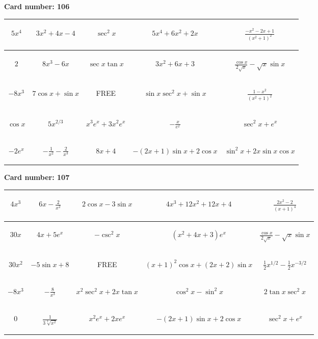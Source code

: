 \documentclass{article}
\newcommand{\entry}[1]{\begin{minipage}[t][2.75cm][t]{4cm} \vspace{1cm} \begin{center}#1\end{center} \end{minipage}}
\newcommand{\freespace}{\entry{FREE}}
\newcommand{\cardnumber}[1]{\noindent \textbf{Card number: #1} \bigskip}
\begin{document}
\pagebreak

\cardnumber{106}
\begin{center}
\begin{tabular}{|*{5}{c|}}
    \hline
    \entry{$5x^4$} & \entry{$3x^2 + 4x - 4$} & \entry{$\sec^2 x$} & \entry{$5x^4 + 6x^2 + 2x$} & \entry{$\frac{-x^2 - 2x + 1}{(x^2 + 1)^2}$} \\ \hline
    \entry{$2$} & \entry{$8x^3 - 6x$} & \entry{$\sec x \tan x$} & \entry{$3x^2 + 6x + 3$} & \entry{$\frac{\cos x}{2 \sqrt{x}} - \sqrt{x} \sin x$} \\ \hline
    \entry{$-8x^3$} & \entry{$7 \cos x + \sin x$} & \freespace & \entry{$\sin x \sec^2 x + \sin x$} & \entry{$\frac{1 - x^2}{(x^2 + 1)^2}$} \\ \hline
    \entry{$\cos x$} & \entry{$5x^{2/3}$} & \entry{$x^3 e^x + 3x^2 e^x$} & \entry{$-\frac{x}{e^x}$} & \entry{$\sec^2 x + e^x$} \\ \hline
    \entry{$-2e^x$} & \entry{$-\frac{1}{x^2} - \frac{2}{x^3}$} & \entry{$8x + 4$} & \entry{$-(2x + 1) \sin x + 2 \cos x$} & \entry{$\sin^2 x + 2x \sin x \cos x$} \\ \hline
\end{tabular}
\end{center}

\pagebreak

\cardnumber{107}
\begin{center}
\begin{tabular}{|*{5}{c|}}
    \hline
    \entry{$4x^3$} & \entry{$6x - \frac{2}{x^2}$} & \entry{$2 \cos x - 3 \sin x$} & \entry{$4x^3 + 12x^2 + 12x + 4$} & \entry{$\frac{2x^2 - 2}{(x + 1)^4}$} \\ \hline
    \entry{$30x$} & \entry{$4x + 5e^x$} & \entry{$-\csc^2 x$} & \entry{$(x^2 + 4x + 3) e^x$} & \entry{$\frac{\cos x}{2 \sqrt{x}} - \sqrt{x} \sin x$} \\ \hline
    \entry{$30x^2$} & \entry{$-5 \sin x + 8$} & \freespace & \entry{$(x + 1)^2 \cos x + (2x + 2) \sin x$} & \entry{$\frac{1}{2} x^{1/2} - \frac{1}{2} x^{-3/2}$} \\ \hline
    \entry{$-8x^3$} & \entry{$-\frac{8}{x^3}$} & \entry{$x^2 \sec^2 x + 2x \tan x$} & \entry{$\cos^2 x - \sin^2 x$} & \entry{$2 \tan x \sec^2 x$} \\ \hline
    \entry{$0$} & \entry{$\frac{1}{3\sqrt[3]{x^2}}$} & \entry{$x^2 e^x + 2x e^x$} & \entry{$-(2x + 1) \sin x + 2 \cos x$} & \entry{$\sec^2 x + e^x$} \\ \hline
\end{tabular}
\end{center}
\end{document}
